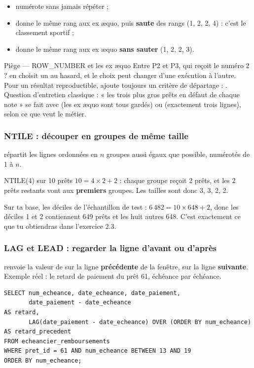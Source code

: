 \begin{itemize}
\item {} numérote sans jamais répéter ;
\item {} donne le même rang aux ex æquo, puis \textbf{saute} des rangs (1, 2, 2, 4) : c'est
le classement sportif ;
\item {} donne le même rang aux ex æquo \textbf{sans sauter} (1, 2, 2, 3).
\end{itemize}

\begin{piege}{Piège --- ROW\_NUMBER et les ex æquo}
Entre P2 et P3, qui reçoit le numéro 2 ?  en choisit un au hasard, et le choix peut
changer d'une exécution à l'autre. Pour un résultat reproductible, ajoute toujours un critère de
départage : . Question d'entretien classique : « les
trois plus gros prêts en défaut de chaque note » se fait avec  (les ex æquo sont tous
gardés) ou  (exactement trois lignes), selon ce que veut le métier.
\end{piege}

\subsubsection{NTILE : découper en groupes de même taille}

 répartit les lignes ordonnées en $n$ groupes aussi égaux que possible, numérotés de 1
à $n$.

\begin{calcul}{NTILE(4) sur 10 prêts}
$10 = 4 \times 2 + 2$ : chaque groupe reçoit 2 prêts, et les $2$ prêts restants vont aux
\textbf{premiers} groupes. Les tailles sont donc 3, 3, 2, 2.

Sur ta base, les déciles de l'échantillon de test : $6\,482 = 10 \times 648 + 2$, donc les déciles 1 et
2 contiennent 649 prêts et les huit autres 648. C'est exactement ce que tu obtiendras dans l'exercice
2.3.
\end{calcul}

\subsubsection{LAG et LEAD : regarder la ligne d'avant ou d'après}

 renvoie la valeur de  sur la ligne \textbf{précédente} de la fenêtre,
 sur la ligne \textbf{suivante}. Exemple réel : le retard de paiement du prêt 61, échéance
par échéance.
\begin{lstlisting}[style=sql]
SELECT num_echeance, date_echeance, date_paiement,
       date_paiement - date_echeance                                     AS retard,
       LAG(date_paiement - date_echeance) OVER (ORDER BY num_echeance)   AS retard_precedent
FROM echeancier_remboursements
WHERE pret_id = 61 AND num_echeance BETWEEN 13 AND 19
ORDER BY num_echeance;
\end{lstlisting}


